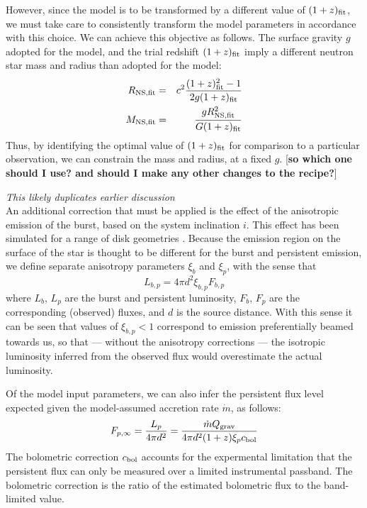 \documentclass{aastex63}
\begin{document}
However, since the model is to be transformed by a different value of $(1+z)_{\rm fit}$, we must take care to consistently transform the model parameters in accordance with this choice.
%
We can achieve this objective as follows. The surface gravity $g$ adopted for the model, and the trial redshift $(1+z)_{\rm fit}$ imply a different neutron star mass and radius than adopted for the model: 
%
\begin{eqnarray}
R_{\rm NS,fit} &=& c^2\frac{(1+z)_{\rm fit}^2-1}{2g(1+z)_{\rm fit}}\\
M_{\rm NS,fit} &=& \frac{gR_{\rm NS,fit}^2}{G(1+z)_{\rm fit}}
\end{eqnarray}
Thus, by identifying the optimal value of $(1+z)_{\rm fit}$ for comparison to a particular observation, we can constrain the mass and radius, at a fixed $g$. [{\bf so which one should I use? and should I make any other changes to the recipe?}]

{\it This likely duplicates earlier discussion} \\
%
An additional correction that must be applied is the effect of the anisotropic emission of the burst, based on the system inclination $i$. This effect has been simulated for a range of disk geometries \cite[e.g.][]{he16}. Because the emission region on the surface of the star is thought to be different for the burst and persistent emission, we define separate anisotropy parameters $\xi_b$ and $\xi_p$, with the sense that
\begin{equation}
L_{b,p} = 4\pi d^2\xi_{b,p}F_{b,p}
\end{equation}
where $L_b$, $L_p$ are the burst and persistent luminosity, $F_b$, $F_p$ are the corresponding (observed) fluxes, and $d$ is the source distance. With this sense it can be seen that values of $\xi_{b,p}<1$ correspond to emission preferentially beamed towards us, so that --- without the anisotropy corrections --- the isotropic luminosity inferred from the observed flux would overestimate the actual luminosity.

Of the model input parameters, we can also infer the persistent flux level expected given the model-assumed accretion rate $\dot{m}$, as follows: %
\begin{equation}
F_{p,\infty} = \frac{L_p}{4\pi d^2} = 
\frac{\dot{m} Q_{\rm grav}}{4\pi d^2 (1+z)\xi_p c_{\rm bol}}
\label{eq:fper}
\end{equation}
%
The bolometric correction $c_{\rm bol}$ accounts for the expermental limitation that the persistent flux can only be measured over a limited instrumental passband. The bolometric correction is the ratio of the estimated bolometric flux to the band-limited value.
\end{document}
